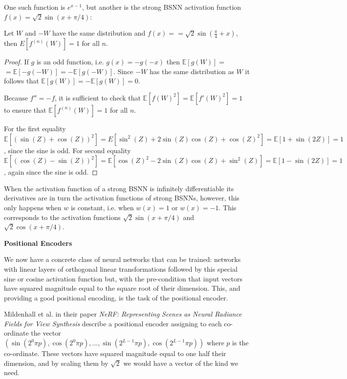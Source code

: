 \documentclass{letter}
\begin{document}
One such function is $e^{x-1}$, but another is the strong BSNN activation function $f(x)=\sqrt{2}\sin(x + \pi/4)$:

\begin{theorem}
Let $W$ and $-W$ have the same distribution and $f(x)=$\newline$=\sqrt{2}\sin(\frac{\pi}{4}+x)$, then $E[f^{(n)}(W)]=1$ for all $n$.
\end{theorem}

\begin{proof}
If $g$ is an odd function, i.e. $g(x)=-g(-x)$ then $\mathbb{E}[g(W)]=$\newline$=\mathbb{E}[-g(-W)]=-\mathbb{E}[g(-W)]$. Since $-W$ has the same distribution as $W$ it follows that $\mathbb{E}[g(W)]=-\mathbb{E}[g(W)]=0$.

Because $f''=-f$, it is sufficient to check that $\mathbb{E}[f(W)^2]=\mathbb{E}[f'(W)^2]=1$ to ensure that $\mathbb{E}[f^{(n)}(W)]=1$ for all $n$.

For the first equality $\mathbb{E}[(\sin(Z)+\cos(Z))^2]=E[\sin^2(Z)+2\sin(Z)\cos(Z)+\cos(Z)^2]=\mathbb{E}[1+\sin(2Z)]=1$, since the sine is odd. For second equality $\mathbb{E}[(\cos(Z)-\sin(Z))^2]=\mathbb{E}[\cos(Z)^2-2\sin(Z)\cos(Z)+\sin^2(Z)]=\mathbb{E}[1-\sin(2Z)]=1$, again since the sine is odd.
\end{proof}

When the activation function of a strong BSNN is infinitely differentiable its derivatives are in turn the activation functions of strong BSNNs, however, this only happens when $w$ is constant, i.e. when $w(x)=1$ or $w(x)=-1$. This corresponds to the activation functions $\sqrt{2}\sin(x + \pi/4)$ and $\sqrt{2}\cos(x + \pi/4)$.

\begin{center}
{\bf Positional Encoders}
\end{center}

We now have a concrete class of neural networks that can be trained: networks with linear layers of orthogonal linear transformations followed by this special sine or cosine activation function but, with the pre-condition that input vectors have squared magnitude equal to the square root of their dimension. This, and providing a good positional encoding, is the task of the positional encoder.

Mildenhall et al. in their paper {\it NeRF: Representing Scenes as Neural Radiance Fields for View Synthesis} describe a positional encoder assigning to each co-ordinate the vector $(\sin(2^0\pi p),\cos(2^0\pi p),...,\sin(2^{L-1}\pi p),\cos(2^{L-1}\pi p))$ where $p$ is the co-ordinate. These vectors have squared magnitude equal to one half their dimension, and by scaling them by $\sqrt{2}$ we would have a vector of the kind we need.
\end{document}
